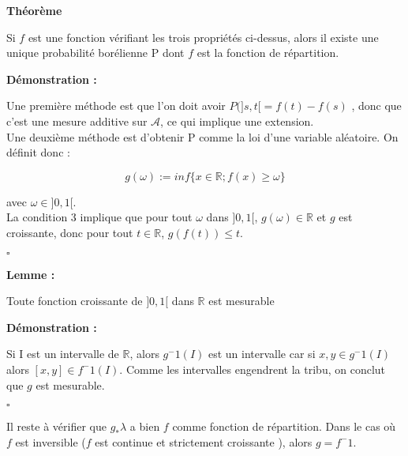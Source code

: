 \documentclass[10pt,a4paper,notitlepage ]{report}
\newcommand{\R}{\mathbb R}
\newcounter{th}
\newenvironment{theorem}[1][]{
\refstepcounter{th}
\begin{tcolorbox}
	\textbf{Théorème \theth \ #1}
	
	
}{\end{tcolorbox}}
\newenvironment{demo}[1][]{

	\textbf{Démonstration #1 :}
}{\begin{flushright}
	$\square$
\end{flushright}
}
\newenvironment{lemme}[1][]{
	\begin{tcolorbox}
		\textbf{Lemme #1 : }
	}
	{\end{tcolorbox}}
\begin{document}
\begin{theorem}
Si $f$ est une fonction vérifiant les trois propriétés ci-dessus, alors il existe une unique probabilité borélienne P dont $f$ est la fonction de répartition.
\end{theorem}

\begin{demo}

Une première méthode est que l'on doit avoir $P(]s,t[ = f(t) - f(s) $ , donc que c'est une mesure additive sur $\mathcal{A}$, ce qui implique une extension. \\

Une deuxième méthode est d'obtenir P comme la loi d'une variable aléatoire. On définit donc : 

$$g(\omega) := inf \lbrace x \in \R ; f(x) \geq \omega \rbrace$$


avec $\omega \in ]0,1[$. \\

La condition 3 implique que pour tout $\omega$ dans $]0,1[$, $g(\omega ) \in \R$ et $g$ est croissante, donc pour tout $t \in \mathbb{R} $, $ g(f(t)) \leq t$. 

\end{demo}

\begin{lemme}
Toute fonction croissante de $]0,1[$ dans $\R$ est mesurable 
\end{lemme}

\begin{demo}

Si I est un intervalle de $\mathbb{R}$, alors $ g^-1 (I) $ est un intervalle car si $x,y \in g^-1 (I) $ alors $[x,y] \in f^-1 (I) $. Comme les intervalles engendrent la tribu, on conclut que $g$ est mesurable. 

\end{demo}

Il reste à vérifier que $g_*  \lambda $ a bien $f$ comme fonction de répartition. Dans le cas où $f$ est inversible ($f$ est continue et strictement croissante ), alors $g = f^-1$.
\end{document}
